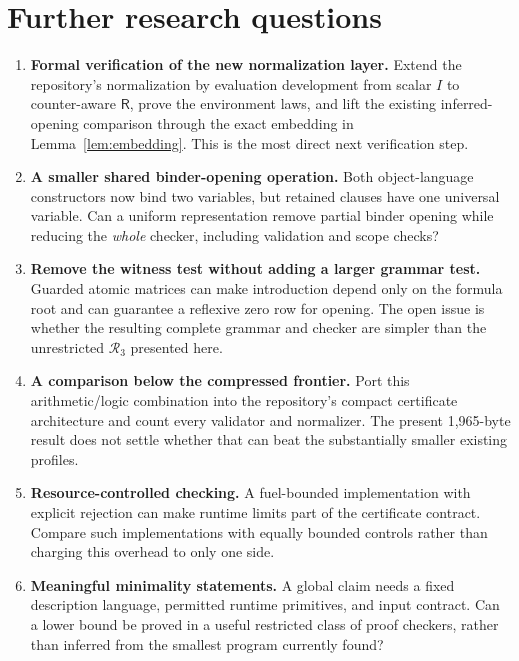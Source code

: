 \documentclass[11pt]{article}
\theoremstyle{definition}
\theoremstyle{remark}
\newcommand{\R}{\mathsf R}
\newcommand{\K}{\mathcal R_3}
\begin{document}
\section{Further research questions}
\label{sec:further}

\begin{enumerate}
 \item \textbf{Formal verification of
 the new normalization layer.}
 Extend the repository's normalization
 by evaluation development from
 scalar $I$ to counter-aware $\R$,
 prove the environment laws, and
 lift the existing inferred-opening
 comparison through the exact
 embedding in Lemma~\ref{lem:embedding}.
 This is the most direct next
 verification step.

 \item \textbf{A smaller shared
 binder-opening operation.}
 Both object-language constructors
 now bind two variables, but retained
 clauses have one universal variable.
 Can a uniform representation remove
 partial binder opening while reducing
 the \emph{whole} checker, including
 validation and scope checks?

 \item \textbf{Remove the witness test
 without adding a larger grammar test.}
 Guarded atomic matrices can make
 introduction depend only on the
 formula root and can guarantee a
 reflexive zero row for opening.
 The open issue is whether the
 resulting complete grammar and
 checker are simpler than the
 unrestricted $\K$ presented here.

 \item \textbf{A comparison below the
 compressed frontier.}
 Port this arithmetic/logic combination
 into the repository's compact
 certificate architecture and count
 every validator and normalizer.
 The present 1,965-byte result does
 not settle whether that can beat
 the substantially smaller existing
 profiles.

 \item \textbf{Resource-controlled
 checking.}
 A fuel-bounded implementation with
 explicit rejection can make runtime
 limits part of the certificate
 contract. Compare such implementations
 with equally bounded controls rather
 than charging this overhead to only
 one side.

 \item \textbf{Meaningful minimality
 statements.}
 A global claim needs a fixed
 description language, permitted
 runtime primitives, and input
 contract. Can a lower bound be
 proved in a useful restricted
 class of proof checkers, rather
 than inferred from the smallest
 program currently found?
\end{enumerate}
\end{document}
